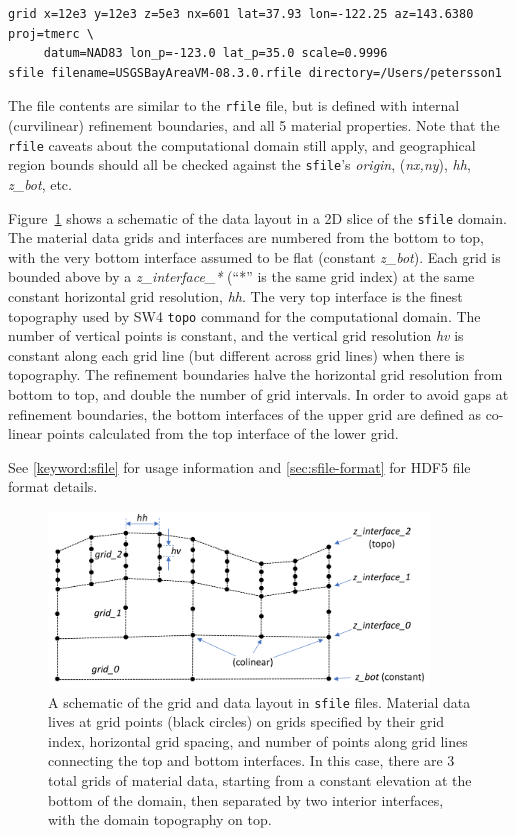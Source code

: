 \documentclass[11pt]{report}
\begin{document}
\begin{verbatim}
grid x=12e3 y=12e3 z=5e3 nx=601 lat=37.93 lon=-122.25 az=143.6380 proj=tmerc \
     datum=NAD83 lon_p=-123.0 lat_p=35.0 scale=0.9996
sfile filename=USGSBayAreaVM-08.3.0.rfile directory=/Users/petersson1
\end{verbatim}

The file contents are similar to the \verb+rfile+ file, but is
  defined with internal (curvilinear) refinement boundaries,
  and all 5 material properties.
Note that the \verb+rfile+ caveats about the computational domain
  still apply, and geographical region bounds should all be
  checked against the \verb+sfile+'s {\em origin}, 
  ({\em nx,ny}), {\em hh}, {\em z\_bot}, etc.

Figure~\ref{fig:sfile} shows a schematic of the data layout in a 2D slice
  of the \verb+sfile+ domain.
The material data grids and interfaces are numbered from the bottom to top,
  with the very bottom interface assumed to be flat (constant {\em z\_bot}).
Each grid is bounded above by a {\em z\_interface\_*} (``*'' is the same 
  grid index) at the same constant horizontal grid resolution, {\em hh}.
The very top interface is the finest topography used by SW4 
  \verb+topo+ command for the computational domain.
The number of vertical points is constant, and the vertical grid resolution
  {\em hv} is constant along each grid line (but different across grid lines)
  when there is topography.
The refinement boundaries halve the horizontal grid resolution from bottom
  to top, and double the number of grid intervals.
In order to avoid gaps at refinement boundaries, the bottom interfaces
  of the upper grid are defined as co-linear points calculated from the top
  interface of the lower grid.

See \ref{keyword:sfile} for usage information and \ref{sec:sfile-format}
  for HDF5 file format details.

\begin{figure}
\begin{center}
\includegraphics[width=0.9\textwidth]{figures/sfile.png}
  \caption{A schematic of the grid and data layout in {\tt sfile} files.
  Material data lives at grid points (black circles) on grids specified
  by their grid index, horizontal grid spacing, and number of points
  along grid lines connecting the top and bottom interfaces.
  In this case, there are 3 total grids of material data, starting
  from a constant elevation at the bottom of the domain, then separated by
  two interior interfaces, with the domain topography on top.
  }
\label{fig:sfile}
\end{center}
\end{figure}
\end{document}
